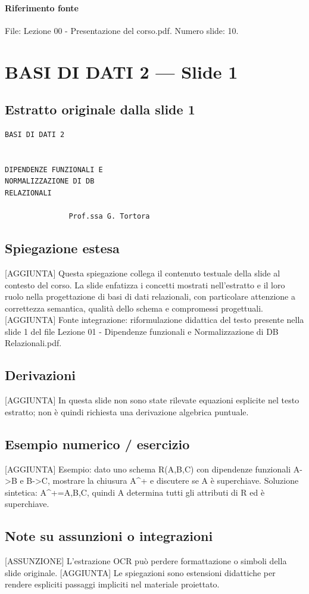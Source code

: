 \documentclass[11pt]{article}
\begin{document}
\paragraph{Riferimento fonte} File: Lezione 00 - Presentazione del corso.pdf. Numero slide: 10.
\section{BASI DI DATI 2 --- Slide 1}
\subsection*{Estratto originale dalla slide 1}
\begin{lstlisting}
BASI DI DATI 2


DIPENDENZE FUNZIONALI E
NORMALIZZAZIONE DI DB
RELAZIONALI

               Prof.ssa G. Tortora
\end{lstlisting}
\subsection*{Spiegazione estesa}
[AGGIUNTA] Questa spiegazione collega il contenuto testuale della slide al contesto del corso. La slide enfatizza i concetti mostrati nell'estratto e il loro ruolo nella progettazione di basi di dati relazionali, con particolare attenzione a correttezza semantica, qualità dello schema e compromessi progettuali.
[AGGIUNTA] Fonte integrazione: riformulazione didattica del testo presente nella slide 1 del file Lezione 01 - Dipendenze funzionali e Normalizzazione di DB Relazionali.pdf.
\subsection*{Derivazioni}
[AGGIUNTA] In questa slide non sono state rilevate equazioni esplicite nel testo estratto; non è quindi richiesta una derivazione algebrica puntuale.
\subsection*{Esempio numerico / esercizio}
[AGGIUNTA] Esempio: dato uno schema R(A,B,C) con dipendenze funzionali A->B e B->C, mostrare la chiusura A^+ e discutere se A è superchiave. Soluzione sintetica: A^+={A,B,C}, quindi A determina tutti gli attributi di R ed è superchiave.
\subsection*{Note su assunzioni o integrazioni}
[ASSUNZIONE] L'estrazione OCR può perdere formattazione o simboli della slide originale.
[AGGIUNTA] Le spiegazioni sono estensioni didattiche per rendere espliciti passaggi impliciti nel materiale proiettato.
\end{document}
